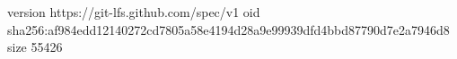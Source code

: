 version https://git-lfs.github.com/spec/v1
oid sha256:af984edd12140272cd7805a58e4194d28a9e99939dfd4bbd87790d7e2a7946d8
size 55426
